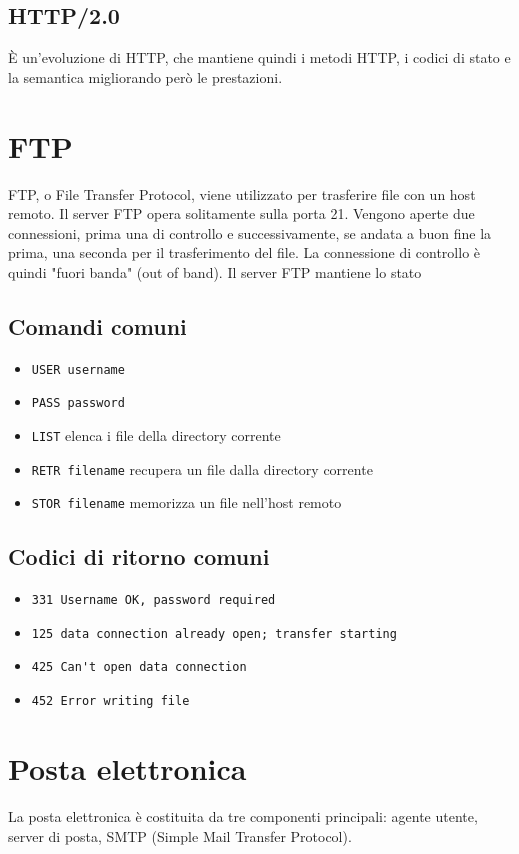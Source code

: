 \documentclass{report}
\begin{document}
	\subsection{HTTP/2.0}
	È un’evoluzione di HTTP, che mantiene quindi i metodi HTTP, i codici di stato e la semantica migliorando però le prestazioni.
	\section{FTP}
	FTP, o File Transfer Protocol, viene utilizzato per trasferire file con un host remoto. Il server FTP opera solitamente sulla porta 21. Vengono aperte due connessioni, prima una di controllo e successivamente, se andata a buon fine la prima, una seconda per il trasferimento del file. La connessione di controllo è quindi "fuori banda" (out of band). Il server FTP mantiene lo stato
	\subsection{Comandi comuni}
	\begin{itemize}
		\item \verb|USER username|
		\item \verb|PASS password|
		\item \verb|LIST| elenca i file della directory corrente
		\item \verb|RETR filename| recupera un file dalla directory corrente
		\item \verb|STOR filename| memorizza un file nell'host remoto
	\end{itemize}
	\subsection{Codici di ritorno comuni}
	\begin{itemize}
		\item \verb|331 Username OK, password required|
		\item \verb|125 data connection already open; transfer starting|
		\item \verb|425 Can't open data connection|
		\item \verb|452 Error writing file|
	\end{itemize}
	\section{Posta elettronica}
	La posta elettronica è costituita da tre componenti principali: agente utente, server di posta, SMTP (Simple Mail Transfer Protocol).
\end{document}
